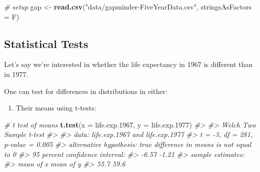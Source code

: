 \documentclass[]{book}
\newenvironment{Shaded}{\begin{snugshade}}{\end{snugshade}}
\newcommand{\CommentTok}[1]{\textcolor[rgb]{0.56,0.35,0.01}{\textit{#1}}}
\newcommand{\DataTypeTok}[1]{\textcolor[rgb]{0.13,0.29,0.53}{#1}}
\newcommand{\DecValTok}[1]{\textcolor[rgb]{0.00,0.00,0.81}{#1}}
\newcommand{\FloatTok}[1]{\textcolor[rgb]{0.00,0.00,0.81}{#1}}
\newcommand{\KeywordTok}[1]{\textcolor[rgb]{0.13,0.29,0.53}{\textbf{#1}}}
\newcommand{\NormalTok}[1]{#1}
\newcommand{\OperatorTok}[1]{\textcolor[rgb]{0.81,0.36,0.00}{\textbf{#1}}}
\newcommand{\StringTok}[1]{\textcolor[rgb]{0.31,0.60,0.02}{#1}}
\providecommand{\tightlist}{%
  \setlength{\itemsep}{0pt}\setlength{\parskip}{0pt}}
\begin{document}
\begin{Shaded}
\begin{Highlighting}[]
\CommentTok{# setup}
\NormalTok{gap <-}\StringTok{ }\KeywordTok{read.csv}\NormalTok{(}\StringTok{"data/gapminder-FiveYearData.csv"}\NormalTok{, }\DataTypeTok{stringsAsFactors =}\NormalTok{ F)}
\end{Highlighting}
\end{Shaded}

\hypertarget{statistical-tests}{%
\subsection{Statistical Tests}\label{statistical-tests}}

Let's say we're interested in whether the life expectancy in 1967 is different than in 1977.

\begin{Shaded}
\end{Shaded}

One can test for differences in distributions in either:

\begin{enumerate}
\def\labelenumi{\arabic{enumi})}
\tightlist
\item
  Their means using t-tests:
\end{enumerate}

\begin{Shaded}
\begin{Highlighting}[]
\CommentTok{# t test of means}
\KeywordTok{t.test}\NormalTok{(}\DataTypeTok{x =}\NormalTok{ life.exp}\FloatTok{.1967}\NormalTok{, }\DataTypeTok{y =}\NormalTok{ life.exp}\FloatTok{.1977}\NormalTok{)}
\CommentTok{#> }
\CommentTok{#>  Welch Two Sample t-test}
\CommentTok{#> }
\CommentTok{#> data:  life.exp.1967 and life.exp.1977}
\CommentTok{#> t = -3, df = 281, p-value = 0.005}
\CommentTok{#> alternative hypothesis: true difference in means is not equal to 0}
\CommentTok{#> 95 percent confidence interval:}
\CommentTok{#>  -6.57 -1.21}
\CommentTok{#> sample estimates:}
\CommentTok{#> mean of x mean of y }
\CommentTok{#>      55.7      59.6}
\end{Highlighting}
\end{Shaded}
\end{document}
